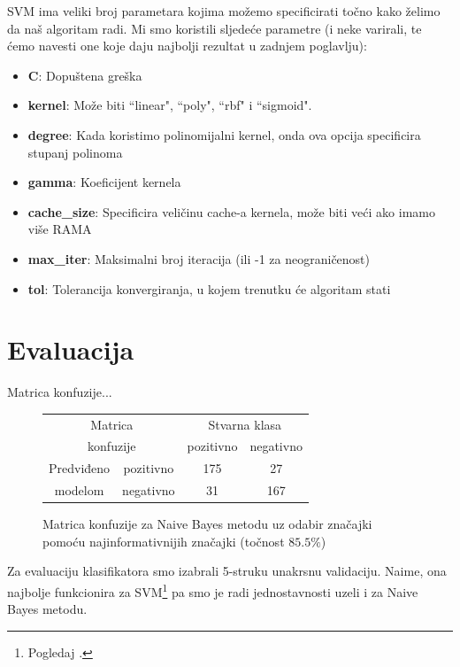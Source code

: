 \documentclass[conference]{IEEEtran}
\begin{document}
SVM ima veliki broj parametara kojima možemo specificirati točno kako želimo
da naš algoritam radi. Mi smo koristili sljedeće parametre (i
neke varirali, te ćemo navesti one koje daju najbolji rezultat u zadnjem
poglavlju):

\begin{itemize}
  \item{\textbf{C}:} Dopuštena greška
  \item{\textbf{kernel}:} Može biti ``linear", ``poly", ``rbf" i ``sigmoid".
  \item{\textbf{degree}:} Kada koristimo polinomijalni kernel, onda ova opcija
    specificira stupanj polinoma
  \item{\textbf{gamma}:} Koeficijent kernela
  \item{\textbf{cache\_size}:} Specificira veličinu cache-a kernela, može biti
    veći ako imamo više RAMA
  \item{\textbf{max\_iter}:} Maksimalni broj iteracija (ili -1 za neograničenost)
  \item{\textbf{tol}:} Tolerancija konvergiranja, u kojem trenutku će algoritam
    stati
\end{itemize}

\section{Evaluacija}

Matrica konfuzije...

\begin{figure}[!ht]
\begin{minipage}{0.5\textwidth}
\centering
\begin{tabular}{|c|c|c|c|}
  \hline
  \multicolumn{2}{|c|}{Matrica}  & \multicolumn{2}{|c|}{Stvarna klasa} \\ 
  \cline{3-4}
  \multicolumn{2}{|c|}{konfuzije} & pozitivno & negativno \\ 
  \hline
  Predviđeno & pozitivno & 175 & 27 \\
  \cline{2-4}
  modelom & negativno & 31 & 167 \\
  \hline
\end{tabular}
\caption{Matrica konfuzije za Naive Bayes metodu uz odabir značajki pomoću najinformativnijih značajki (točnost $85.5\%$)}
\end{minipage}
\end{figure}

Za evaluaciju klasifikatora smo izabrali 5-struku unakrsnu validaciju. Naime, ona najbolje funkcionira za SVM\footnote{Pogledaj \cite{scikit}.} pa smo je radi jednostavnosti uzeli i za Naive Bayes metodu.\\
\end{document}
